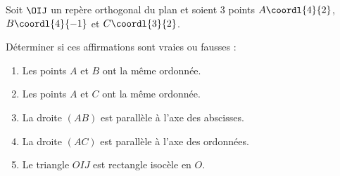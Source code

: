 \begin{exo}
	Soit $\OIJ$ un repère orthogonal du plan et soient $3$ points $A\coordl{4}{2}$, $B\coordl{4}{-1}$ et $C\coordl{3}{2}$.

	Déterminer si ces affirmations sont vraies ou fausses :
	\begin{enumerate}
		\item Les points $A$ et $B$ ont la même ordonnée.
		\item Les points $A$ et $C$ ont la même ordonnée.
		\item La droite $(AB)$ est parallèle à l'axe des abscisses.
		\item La droite $(AC)$ est parallèle à l'axe des ordonnées.
		\item Le triangle $OIJ$ est rectangle isocèle en $O$.
	\end{enumerate}
\end{exo}
